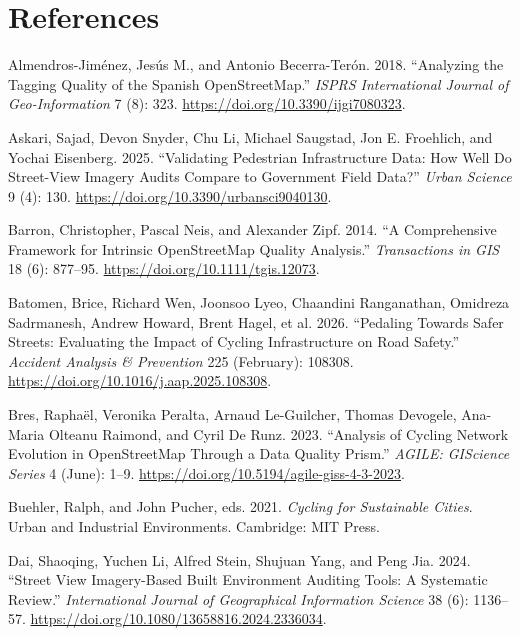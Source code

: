 \documentclass[
]{article}
\newlength{\cslhangindent}
\newenvironment{CSLReferences}[2] %
 {\begin{list}{}{%
  \setlength{\itemindent}{0pt}
  \setlength{\leftmargin}{0pt}
  \setlength{\parsep}{0pt}
  \ifodd #1
   \setlength{\leftmargin}{\cslhangindent}
   \setlength{\itemindent}{-1\cslhangindent}
  \fi
  \setlength{\itemsep}{#2\baselineskip}}}
 {\end{list}}
\begin{document}
\section*{References}\label{references}

\label{refs}
\begin{CSLReferences}{1}{0}
Almendros-Jiménez, Jesús M., and Antonio Becerra-Terón. 2018.
{``Analyzing the {Tagging} {Quality} of the {Spanish}
{OpenStreetMap}.''} \emph{ISPRS International Journal of
Geo-Information} 7 (8): 323. \url{https://doi.org/10.3390/ijgi7080323}.

Askari, Sajad, Devon Snyder, Chu Li, Michael Saugstad, Jon E. Froehlich,
and Yochai Eisenberg. 2025. {``Validating {Pedestrian} {Infrastructure}
{Data}: {How} {Well} {Do} {Street}-{View} {Imagery} {Audits} {Compare}
to {Government} {Field} {Data}?''} \emph{Urban Science} 9 (4): 130.
\url{https://doi.org/10.3390/urbansci9040130}.

Barron, Christopher, Pascal Neis, and Alexander Zipf. 2014. {``A
{Comprehensive} {Framework} for {Intrinsic} {OpenStreetMap} {Quality}
{Analysis}.''} \emph{Transactions in GIS} 18 (6): 877--95.
\url{https://doi.org/10.1111/tgis.12073}.

Batomen, Brice, Richard Wen, Joonsoo Lyeo, Chaandini Ranganathan,
Omidreza Sadrmanesh, Andrew Howard, Brent Hagel, et al. 2026.
{``Pedaling Towards Safer Streets: Evaluating the Impact of Cycling
Infrastructure on Road Safety.''} \emph{Accident Analysis \& Prevention}
225 (February): 108308. \url{https://doi.org/10.1016/j.aap.2025.108308}.

Bres, Raphaël, Veronika Peralta, Arnaud Le-Guilcher, Thomas Devogele,
Ana-Maria Olteanu Raimond, and Cyril De Runz. 2023. {``Analysis of
Cycling Network Evolution in {OpenStreetMap} Through a Data Quality
Prism.''} \emph{AGILE: GIScience Series} 4 (June): 1--9.
\url{https://doi.org/10.5194/agile-giss-4-3-2023}.

Buehler, Ralph, and John Pucher, eds. 2021. \emph{Cycling for
Sustainable Cities}. Urban and {Industrial} {Environments}. Cambridge:
MIT Press.

Dai, Shaoqing, Yuchen Li, Alfred Stein, Shujuan Yang, and Peng Jia.
2024. {``Street View Imagery-Based Built Environment Auditing Tools: A
Systematic Review.''} \emph{International Journal of Geographical
Information Science} 38 (6): 1136--57.
\url{https://doi.org/10.1080/13658816.2024.2336034}.


\end{CSLReferences}
\end{document}
